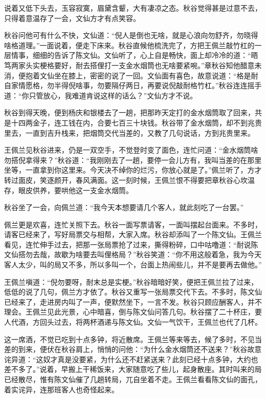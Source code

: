 \documentclass[12pt,UTF8]{ctexbook}
\begin{document}
{{{说着又低下头去，玉容寂寞，眉黛含颦，大有凄凉之态。秋谷觉得甚是过意不去，只得着意温存了一会，文仙方才有点笑容。

秋谷问他可有什么不快，文仙道：“倪人是倒也无啥，就是心浪向勿舒齐，勿晓得啥格道理。”一面说着，便走下床来。秋谷直候他梳洗完了，方把王佩兰敲竹杠的一层情事，细细的告诉了陈文仙。文仙听了，心上自是畅快，面上却冷冷的道：“晤笃两家头实梗格要好，耐去搭俚打一支金水烟筒也无啥要紧啘。”章秋谷知他醋意未消，便抱着文仙坐在膝上，密密的说了一回。文仙面有喜色，故意说道：“格是耐自家情愿格，勿半得倪啥事，勿要隔仔两日，再要说倪敲耐格竹杠。”秋谷连连摇手道：“你只管放心，我难道肯说这样的话么？”文仙方才不说。

秋谷到得天晚，便到杨庆和银楼去了一趟，把那昨天定打的金水烟筒取了回来，共是十四两金子，连工钱在内，合要七百三十块钱。秋谷带了金水烟筒，却不到兆贵里去，一直到吉升栈来，把烟筒交代当差的，又教了几句说话，方到兆贵里来。

王佩兰见秋谷进来，仍是一双空手，不觉登时变了面色，连忙问道：“金水烟筒啥勿搭倪拿得来？”秋谷道：“我刚刚去了一趟，要停一会儿方有，我叫当差的在那里坐等，一直拿到你这里来。今天决不绰你的烂污，你放心就是了。”佩兰听了，方才转过面皮，笑逐颜开，春风满面。这一刻时候，王佩兰恨不得要把章秋谷心坎温存，眼皮供养，要哄他这一支金水烟筒。

秋谷坐了一会，向佩兰道：“我今天本想要请几个客人，就此刻吃了一台罢。”

佩兰更是欢喜，连忙关照下去。秋谷一面写票请客，一面叫摆起台面来。不多时，请客已经来了，写好局票交与相帮，大家入席。秋谷却添叫了一个陈文仙。王佩兰看见，连忙伸手过去，把那一张局票抢了过来，撕得粉碎，口中咕噜道：“耐说陈文仙搭勿去哉，故歇为啥要去叫俚格局？”秋谷笑道：“你不用这般着急，我为今天客人太少，叫的局又不多，所以多叫一个，台面上热闹些儿，并不是要再去做他。”

王佩兰嗔道：“倪勿要呀，耐末总是实梗。”秋谷暗暗好笑，便把王佩兰拉了过来，低低的说了几句，佩兰方才依了。秋谷又重写一张局票交代下去。不多时，陈文仙已经来了，走进房内叫了一声，便默然坐下，一言不发。秋谷只顾应酬客人，并不理会。王佩兰见此光景，心中暗喜，倒与陈文仙问答几句。秋谷摆了二十杯庄，要人代酒，方回头过去，将两杯酒递与陈文仙。文仙一气饮干，王佩兰也代了几杯。

这一席酒，不觉已吃到十点多钟，将近散席。王佩兰等来等去，候了多时，不见当差的到来，便伏在秋谷肩上，悄悄的问他：“为什么金水烟筒还不送来？”秋谷故意诧异道：“这奴才真是没要紧，为什么还不赶紧送来？此刻已经十点多钟，大约也差不多了。”说着，早搬上干稀饭来，大家随意吃了些儿，起身散座。其时叫来的局已经散尽，惟有陈文仙催了几趟转局，兀自坐着不走。王佩兰看看陈文仙的面孔，着实诧异，连那班客人也奇怪起来。

}}}
\end{document}
